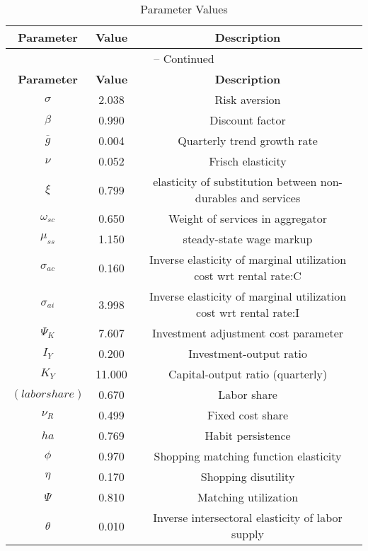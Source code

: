 \begin{center}
\begin{longtable}{ccc}
\caption{Parameter Values}\\%
\toprule%
\multicolumn{1}{c}{\textbf{Parameter}} &
\multicolumn{1}{c}{\textbf{Value}} &
 \multicolumn{1}{c}{\textbf{Description}}\\%
\midrule%
\endfirsthead
\multicolumn{3}{c}{{\tablename} \thetable{} -- Continued}\\%
\midrule%
\multicolumn{1}{c}{\textbf{Parameter}} &
\multicolumn{1}{c}{\textbf{Value}} &
  \multicolumn{1}{c}{\textbf{Description}}\\%
\midrule%
\endhead
${\sigma}$ 	 & 	 2.038 	 & 	 Risk aversion\\
${\beta}$ 	 & 	 0.990 	 & 	 Discount factor\\
${\overline{g}}$ 	 & 	 0.004 	 & 	 Quarterly trend growth rate\\
$\nu$ 	 & 	 0.052 	 & 	 Frisch elasticity\\
$\xi$ 	 & 	 0.799 	 & 	 elasticity of substitution between non-durables and services\\
$\omega_{sc}$ 	 & 	 0.650 	 & 	 Weight of services in aggregator\\
$\mu_{ss}$ 	 & 	 1.150 	 & 	 steady-state wage markup\\
${\sigma_{ac}}$ 	 & 	 0.160 	 & 	 Inverse elasticity of marginal utilization cost wrt rental rate:C\\
${\sigma_{ai}}$ 	 & 	 3.998 	 & 	 Inverse elasticity of marginal utilization cost wrt rental rate:I\\
${\Psi_{K}}$ 	 & 	 7.607 	 & 	 Investment adjustment cost parameter\\
${I_Y}$ 	 & 	 0.200 	 & 	 Investment-output ratio\\
${K_Y}$ 	 & 	 11.000 	 & 	 Capital-output ratio (quarterly)\\
$(labor share)$ 	 & 	 0.670 	 & 	 Labor share\\
${\nu_R}$ 	 & 	 0.499 	 & 	 Fixed cost share\\
${ha}$ 	 & 	 0.769 	 & 	 Habit persistence\\
${\phi}$ 	 & 	 0.970 	 & 	 Shopping matching function elasticity\\
${\eta}$ 	 & 	 0.170 	 & 	 Shopping disutility\\
${\Psi}$ 	 & 	 0.810 	 & 	 Matching utilization\\
${\theta}$ 	 & 	 0.010 	 & 	 Inverse intersectoral elasticity of labor supply\\

\end{longtable}
\end{center}
